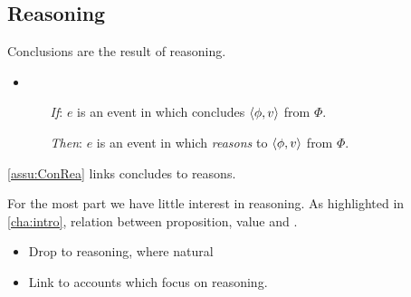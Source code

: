 \subsection{Reasoning}
\label{sec:reasoniing}

\begin{note}
  Conclusions are the result of reasoning.

  \begin{assumption}
    \label{assu:ConRea}

    \begin{itemize}
    \item
      \begin{itemize}
      \item[\emph{If}:]
        \(e\) is an event in which \vAgent{} concludes \(\langle \phi, v \rangle\) from \(\Phi\).
      \item[\emph{Then}:]
        \(e\) is an event in which \vAgent{} \emph{reasons} to \(\langle \phi, v \rangle\) from \(\Phi\).
      \end{itemize}
    \end{itemize}
    \vspace{-\baselineskip}
  \end{assumption}

  \autoref{assu:ConRea} links concludes to reasons.

  For the most part we have little interest in reasoning.
  As highlighted in \autoref{cha:intro}, relation between proposition, value and \pool{}.

  \begin{itemize}
  \item
    Drop to reasoning, where natural
  \item
    Link to accounts which focus on reasoning.
  \end{itemize}
\end{note}

